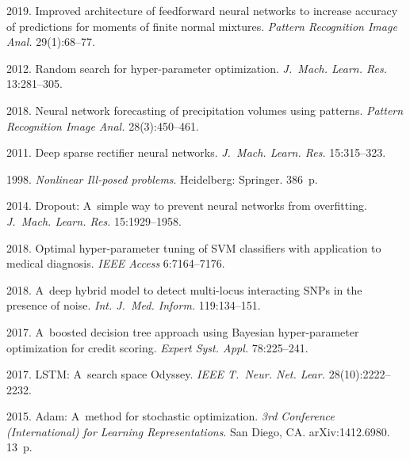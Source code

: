 \begin{multicols}{2}
{{\begin{thebibliography}{99}
 2019. 
Improved architecture of feedforward neural networks to increase accuracy 
of predictions for moments of finite normal mixtures. 
\textit{Pattern Recognition Image Anal.} 29(1):68--77.

 2012. Random search for hyper-parameter optimization. 
\textit{J.~Mach. Learn. Res.} 13:281--305.

 2018. Neural
network forecasting of precipitation volumes using patterns. 
\textit{Pattern Recognition Image Anal.} 28(3):450--461.

 2011. Deep sparse rectifier neural networks.
\textit{J.~Mach. Learn. Res.} 15:315--323.

 1998. \textit{Nonlinear 
Ill-posed problems}.  Heidelberg: Springer. 386~p.

 2014. Dropout: A~simple way to prevent neural networks from overfitting.
 \textit{J.~Mach. Learn. Res.} 15:1929--1958.

 2018. Optimal hyper-parameter tuning of SVM classifiers 
with application to medical diagnosis. \textit{IEEE Access} 6:7164--7176.

 2018. A~deep hybrid model 
to detect multi-locus interacting SNPs in the presence of noise. 
\textit{Int. J.~Med. Inform.} 119:134--151.

 2017. 
A~boosted decision tree approach using Bayesian hyper-parameter optimization 
for credit scoring. \textit{Expert Syst. Appl.} 78:225--241.
{

}

  2017. LSTM: A~search space Odyssey. 
\textit{IEEE T.~Neur. Net. Lear.} 28(10):2222--2232.

 2015. Adam: A~method for stochastic optimization. 
\textit{3rd  Conference (International)
for Learning Representations}. San Diego, CA. arXiv:1412.6980. 13~p.


\end{thebibliography}}}
\end{multicols}
